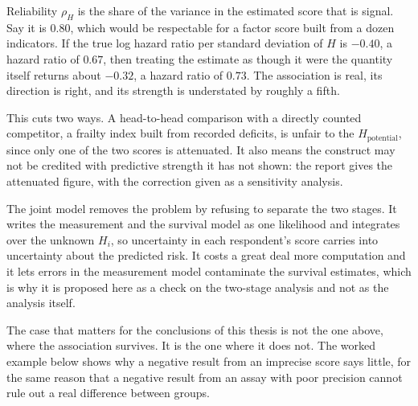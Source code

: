 \begin{reading}
Reliability $\rho_H$ is the share of the variance in the estimated score that
is signal. Say it is $0.80$, which would be respectable for a factor score
built from a dozen indicators. If the true log hazard ratio per standard
deviation of $H$ is $-0.40$, a hazard ratio of $0.67$, then treating the
estimate as though it were the quantity itself returns about $-0.32$, a hazard
ratio of $0.73$. The association is real, its direction is right, and its
strength is understated by roughly a fifth.

This cuts two ways. A head-to-head comparison with a directly counted
competitor, a frailty index built from recorded deficits, is unfair to the
$H_{\text{potential}}$, since only one of the two scores is attenuated. It also
means the construct may not be credited with predictive strength it has not
shown: the report gives the attenuated figure, with the correction given as
a sensitivity analysis.

The joint model removes the problem by refusing to separate the two stages. It
writes the measurement and the survival model as one likelihood and integrates
over the unknown $H_i$, so uncertainty in each respondent's score carries into
uncertainty about the predicted risk. It costs a great deal more computation
and it lets errors in the measurement model contaminate the survival estimates,
which is why it is proposed here as a check on the two-stage analysis and not
as the analysis itself.
\end{reading}

The case that matters for the conclusions of this thesis is not the one above,
where the association survives. It is the one where it does not. The worked
example below shows why a negative result from an imprecise score says little,
for the same reason that a negative result from an assay with poor precision
cannot rule out a real difference between groups.

